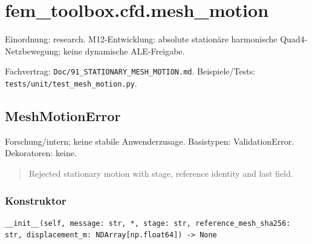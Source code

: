 \section{fem\_toolbox.cfd.mesh\_motion}
Einordnung: research. M12-Entwicklung: absolute stationäre harmonische Quad4-Netzbewegung; keine dynamische ALE-Freigabe.
\par Fachvertrag: \nolinkurl{Doc/91_STATIONARY_MESH_MOTION.md}. Beispiele/Tests:
\nolinkurl{tests/unit/test_mesh_motion.py}.
\subsection{MeshMotionError}
Forschung/intern; keine stabile Anwenderzusage.
Basistypen: ValidationError. Dekoratoren: keine.
\begin{quote}
Rejected stationary motion with stage, reference identity and last field.
\end{quote}
\subsubsection*{Konstruktor}
\begin{lstlisting}
__init__(self, message: str, *, stage: str, reference_mesh_sha256: str, displacement_m: NDArray[np.float64]) -> None
\end{lstlisting}
